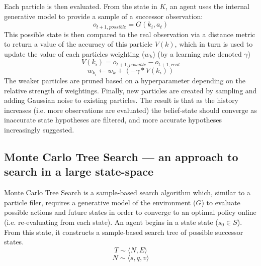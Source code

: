 \newline \newline
Each particle is then evaluated. From the state in $K$, an agent uses the internal generative model to provide a sample of a successor observation: 
\begin{equation}
    o_{t+1, possible} = G(k_i, a_t)
\end{equation}
This possible state is then compared to the real observation via a distance metric to return a value of the accuracy of this particle $V(k)$, which in turn is used to update the value of each particles weighting ($w_k$) (by a learning rate denoted $\gamma$) 
\begin{equation}
    V(k_i) = o_{t+1, possible} - o_{t+1, real}
\end{equation}
\begin{equation}
    w_{k_i} \leftarrow w_k + (- \gamma * V(k_i))
\end{equation}
The weaker particles are pruned based on a hyperparameter depending on the relative strength of weightings. Finally, new particles are created by sampling and adding Gaussian noise to existing particles. 
\newline \newline
The result is that as the history increases (i.e. more observations are evaluated) the belief-state should converge as inaccurate state hypotheses are filtered, and more accurate hypotheses increasingly suggested. 

\subsection{Monte Carlo Tree Search --- an approach to search in a large state-space}
Monte Carlo Tree Search is a sample-based search algorithm which, similar to a particle filer, requires a generative model of the environment ($G$) to evaluate possible actions and future states in order to converge to an optimal policy online (i.e. re-evaluating from each state). 
\newline \newline
An agent begins in a state state ($s_0 \in S$). From this state, it constructs a sample-based search tree of possible successor states.
\begin{equation}
    T \sim \langle N, E \rangle
\end{equation} 
\begin{equation}
    N \sim \langle s, q, v \rangle 
\end{equation}

